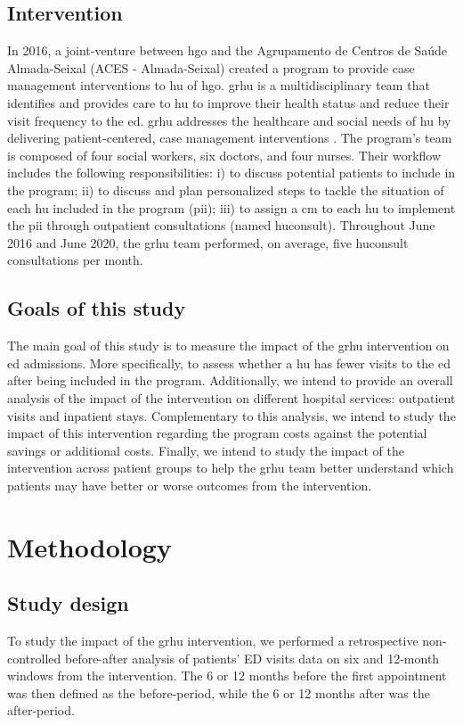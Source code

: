\documentclass{bmcart}
\begin{document}
\subsection*{Intervention}

In 2016, a joint-venture between \gls{hgo} and the Agrupamento de Centros de Saúde Almada-Seixal (ACES - Almada-Seixal) created a program to provide case management interventions to \gls{hu} of \gls{hgo}.
\gls{grhu} is a multidisciplinary team that identifies and provides care to \gls{hu} to improve their health status and reduce their visit frequency to the \gls{ed}.
\gls{grhu} addresses the healthcare and social needs of \gls{hu} by delivering patient-centered, case management interventions \cite{kanter_clinical_1989}.
The program's team is composed of four social workers, six doctors, and four nurses.
Their workflow includes the following responsibilities: i) to discuss potential patients to include in the program; ii) to discuss and plan personalized steps to tackle the situation of each \gls{hu} included in the program (\gls{pii}); iii) to assign a \gls{cm} to each \gls{hu} to implement the \gls{pii} through outpatient consultations (named \gls{huconsult}).
Throughout June 2016 and June 2020, the \gls{grhu} team performed, on average, five \gls{huconsult} consultations per month. 

\subsection*{Goals of this study}
The main goal of this study is to measure the impact of the \gls{grhu} intervention on \gls{ed} admissions. 
More specifically, to assess whether a \gls{hu} has fewer visits to the \gls{ed} after being included in the program. Additionally, we intend to provide an overall analysis of the impact of the intervention on different hospital services: outpatient visits and inpatient stays. 
Complementary to this analysis, we intend to study the impact of this intervention regarding the program costs against the potential savings or additional costs. Finally, we intend to study the impact of the intervention across patient groups to help the \gls{grhu} team better understand which patients may have better or worse outcomes from the intervention.

\section*{Methodology}

\subsection*{Study design}
To study the impact of the \gls{grhu} intervention, we performed a retrospective non-controlled before-after analysis of patients' ED visits data on six and 12-month windows from the intervention. The 6 or 12 months before the first appointment was then defined as the before-period, while the 6 or 12 months after was the after-period.
\end{document}
